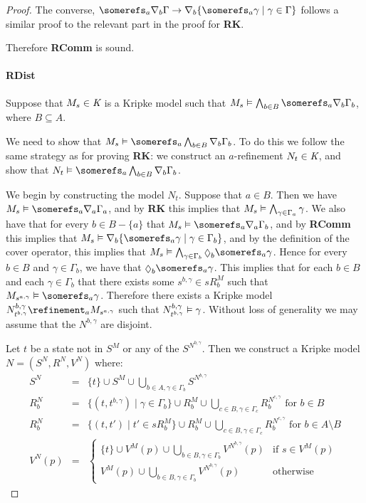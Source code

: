 \begin{proof}
The converse, $\somerefs_a \covers_b \Gamma \implies \covers_b \{\somerefs_a
\gamma \mid \gamma \in \Gamma\}$ follows a similar proof to the relevant part in
the proof for {\bf RK}.

Therefore {\bf RComm} is sound.

\paragraph{RDist}
Suppose that $M_s \in \textit{K}$ is a Kripke model such that $M_s \entails
\bigwedge_{b \in B} \somerefs_a \covers_b \Gamma_b$, where $B \subseteq A$.

We need to show that $M_s \entails \somerefs_a \bigwedge_{b \in B} \covers_b
\Gamma_b$. To do this we follow the same strategy as for proving {\bf RK}: we
construct an $a$-refinement $N_t \in \textit{K}$, and show that $N_t \entails
\somerefs_a \bigwedge_{b \in B} \covers_b \Gamma_b$.

We begin by constructing the model $N_t$. Suppose that $a \in B$. Then we have
$M_s \entails \somerefs_a \covers_a \Gamma_a$, and by {\bf RK} this implies that
$M_s \vDash \bigwedge_{\gamma \in \Gamma_a} \gamma$. We also have that for
every $b \in B - \{a\}$ that $M_s \entails \somerefs_a \covers_a \Gamma_b$, and
by {\bf RComm} this implies that $M_s \entails \covers_b \{\somerefs_a \gamma
\mid \gamma \in \Gamma_b\}$, and by the definition of the cover operator, this
implies that $M_s \entails \bigwedge_{\gamma \in \Gamma_b} \suspects_b
\somerefs_a \gamma$. Hence for every $b \in B$ and $\gamma \in \Gamma_b$, we
have that $\suspects_b \somerefs_a \gamma$. This implies that for each $b \in B$
and each $\gamma \in \Gamma_b$ that there exists some $s^{b,\gamma} \in sR^M_b$ such
that $M_{s^{a,\gamma}} \entails \somerefs_a \gamma$. Therefore there exists a Kripke
model $N^{b,\gamma}_{t^{b,\gamma}} \refinement_a M_{s^{a,\gamma}}$ such that
$N^{b,\gamma}_{t^{b,\gamma}} \vDash \gamma$. Without loss of generality we
may assume that the $N^{b,\gamma}$ are disjoint.

Let $t$ be a state not in $S^M$ or any of the $S^{N^{b,\gamma}}$. Then we construct a
Kripke model $N = (S^N, R^N, V^N)$ where:
\begin{eqnarray*}
S^N &=& \{t\} \cup S^M \cup \bigcup_{b \in A, \gamma \in \Gamma_b} S^{N^{b,\gamma}}\\
R^N_b &=& \{(t, t^{b,\gamma}) \mid \gamma \in \Gamma_b\} \cup R^M_b \cup
\bigcup_{c \in B, \gamma \in \Gamma_c} R^{N^{c,\gamma}}_b \text{ for $b \in
B$}\\
R^N_b &=& \{(t, t') \mid t' \in sR^M_b\} \cup R^M_b \cup
\bigcup_{c \in B, \gamma \in \Gamma_c} R^{N^{c,\gamma}}_b \text{ for $b \in A
\setminus B$}\\
V^N(p) &=& 
\begin{cases}
\displaystyle \{t\} \cup V^M(p) \cup \bigcup_{b \in B, \gamma \in \Gamma_b}
V^{N^{b,\gamma}}(p) & \text{if $s \in V^M(p)$}\\
\displaystyle V^M(p) \cup \bigcup_{b \in B, \gamma \in \Gamma_b}
V^{N^{b,\gamma}}(p) & \text{otherwise}
\end{cases}
\end{eqnarray*}


\end{proof}
